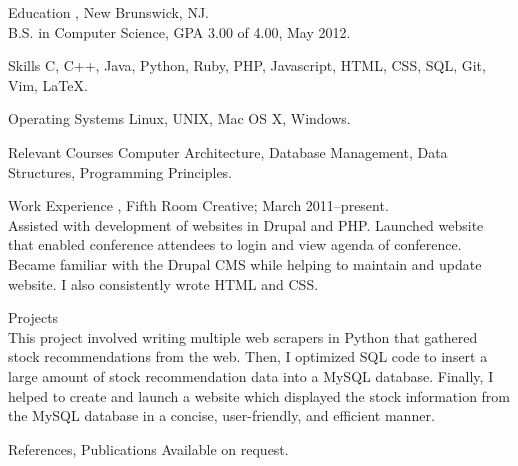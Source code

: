 \documentclass{resume}
\author{~~~~~~Michael J. Wilcox}
\begin{document}
\maketitle


\begin{category}{Education}
, New Brunswick, NJ.\\
B.S. in Computer Science,  GPA 3.00 of 4.00, May 2012.
\end{category}

\begin{category}{Skills}
\citemnobullet 
C, C++, Java, Python, Ruby, PHP, Javascript, HTML, CSS, SQL, Git, Vim, \LaTeX.
\end{category}

\begin{category}{Operating Systems}
\citemnobullet
Linux, UNIX, Mac OS X, Windows.\\
\end{category}

\begin{category}{Relevant Courses}
\citemnobullet
Computer Architecture, Database Management, Data Structures, Programming Principles.
\end{category}

\begin{category}{Work Experience}
, Fifth Room Creative;
March 2011--present.\\
Assisted with development of websites in Drupal and PHP. Launched website that enabled conference attendees to login and view agenda of conference. Became familiar with the Drupal CMS while helping to maintain and update website. I also consistently wrote HTML and CSS. %
\end{category}

\begin{category}{Projects}
\\
This project involved writing multiple web scrapers in Python that gathered stock recommendations from the web. Then, I optimized SQL code to insert a large amount of stock recommendation data into a MySQL database. Finally, I helped to create and launch a website which displayed the stock information from the MySQL database in a concise, user-friendly, and efficient manner.
\end{category}


\begin{category}{References, Publications} 
\citemnobullet Available on request.
\end{category}
\end{document}
